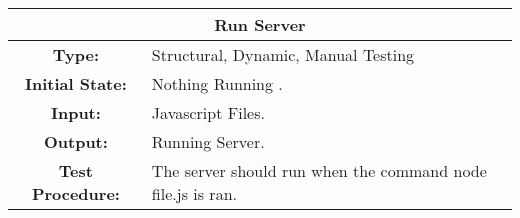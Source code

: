 \documentclass[12pt, titlepage]{article}
\begin{document}
	
\begin{center}
\begin{table}[H]
\begin{tabularx}{\textwidth}{| c X |}
\hline
\multicolumn{2}{|c|}{\textbf{Run Server}}\\
\hline
\textbf{Type: } & Structural, Dynamic, Manual Testing\\

\textbf{Initial State: } & Nothing Running .\\

\textbf{Input: } & Javascript Files.\\

\textbf{Output: } & Running Server.\\

\textbf{Test Procedure: } & The server should run when the command node file.js is ran. \\
\hline
\end{tabularx}
\end{table}
\end{center}
	
\end{document}
